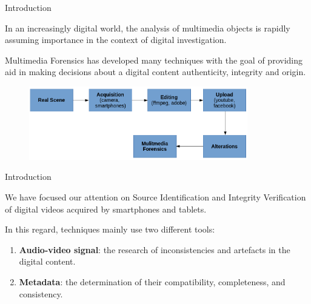 \begin{tframe}{Introduction}

\vspace{0.2cm}

In an increasingly digital world, the analysis of multimedia objects is rapidly assuming importance in the context of digital investigation.

\vspace{0.5cm}

Multimedia Forensics has developed many techniques with the goal of providing aid in making decisions about a digital content authenticity, integrity and origin.

\begin{figure}
\centering
    \includegraphics[width=0.85\textwidth]{images/workflow.png}
\end{figure}

\end{tframe}

\begin{tframe}{Introduction}

\vspace{0.2cm}

We have focused our attention on Source Identification and Integrity Verification of digital videos acquired by smartphones and tablets.

\vspace{0.5cm}

In this regard, techniques mainly use two different tools:

\begin{enumerate}
\item \textbf{Audio-video signal}: the research of inconsistencies and artefacts in the digital content.
\item \textbf{Metadata}: the determination of their compatibility, completeness, and consistency.
\end{enumerate}

\end{tframe}

